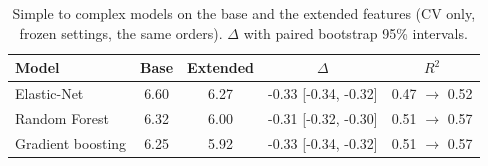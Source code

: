 \begin{table}[t]
\centering
\caption{Simple to complex models on the base and the extended features (CV only, frozen settings, the same orders). $\Delta$ with paired bootstrap 95\% intervals.}
\label{tab:ladder}
\small
\begin{tabular}{@{}lcccc@{}}
\toprule
Model & Base & Extended & $\Delta$ & $R^2$ \\
\midrule
Elastic-Net & 6.60 & 6.27 & -0.33 [-0.34, -0.32] & 0.47 $\to$ 0.52 \\
Random Forest & 6.32 & 6.00 & -0.31 [-0.32, -0.30] & 0.51 $\to$ 0.57 \\
Gradient boosting & 6.25 & 5.92 & -0.33 [-0.34, -0.32] & 0.51 $\to$ 0.57 \\
\bottomrule
\end{tabular}
\end{table}
